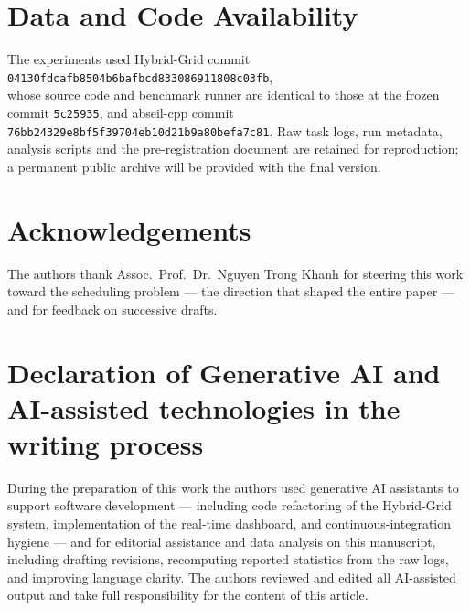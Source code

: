\documentclass[final,5p,times,twocolumn]{elsarticle}
\begin{document}
\section*{Data and Code Availability}

The experiments used Hybrid-Grid commit\\ \texttt{04130fdcafb8504b6bafbcd833086911808c03fb},\\ whose source code and benchmark runner are identical to those at the frozen commit \texttt{5c25935}, and abseil-cpp commit\\ \texttt{76bb24329e8bf5f39704eb10d21b9a80befa7c81}. Raw task logs, run metadata, analysis scripts and the pre-registration document are retained for reproduction; a permanent public archive will be provided with the final version.

\section*{Acknowledgements}

The authors thank Assoc.~Prof.~Dr.~Nguyen Trong Khanh for steering this work toward the scheduling problem --- the direction that shaped the entire paper --- and for feedback on successive drafts.

\section*{Declaration of Generative AI and AI-assisted technologies in the writing process}

During the preparation of this work the authors used generative AI assistants to support software development --- including code refactoring of the Hybrid-Grid system, implementation of the real-time dashboard, and continuous-integration hygiene --- and for editorial assistance and data analysis on this manuscript, including drafting revisions, recomputing reported statistics from the raw logs, and improving language clarity. The authors reviewed and edited all AI-assisted output and take full responsibility for the content of this article.
\end{document}
